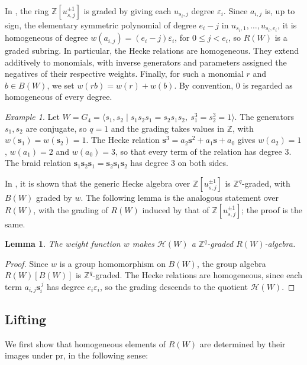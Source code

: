 \documentclass[11pt, reqno]{amsart}
\newcommand{\cH}{\mathcal{H}}
\numberwithin{equation}{section}
\newtheorem{lemma}[theorem]{Lemma}
\theoremstyle{remark}
\newtheorem{example}[theorem]{Example}
\begin{document}
In \cite[\S 1C]{BMM}, the ring $\mathbb Z[u_{s,j}^{\pm1}]$ is graded by giving
each $u_{s_i,j}$ degree $\varepsilon_i$. Since $a_{i,j}$ is, up to sign,
the elementary symmetric polynomial of degree $e_i-j$ in
$u_{s_i,1},\dots,u_{s_i,e_i}$, it is homogeneous of degree
$w(a_{i,j})=(e_i-j)\varepsilon_i$, for $0\le j<e_i$, so $R(W)$ is a
graded subring.
In particular, the Hecke relations are homogeneous. They extend additively to monomials, with inverse generators and parameters assigned the negatives of their respective weights. Finally,
for such a monomial $r$ and $b\in B(W)$, we set $w(rb)=w(r)+w(b)$.  By convention, $0$ is regarded as homogeneous of every degree.

\begin{example}
	Let $W=G_4=\langle s_1,s_2\mid s_1s_2s_1=s_2s_1s_2,\ s_1^3=s_2^3=1\rangle$. The generators $s_1,s_2$ are
	conjugate, so $q=1$ and the grading takes values in $\mathbb Z$, with $w(\mathbf s_1)=w(\mathbf s_2)=1$.
	The Hecke relation $\mathbf s^3=a_2\mathbf s^2+a_1\mathbf s+a_0$ gives $w(a_2)=1$, $w(a_1)=2$ and
	$w(a_0)=3$, so that every term of the relation has degree $3$. The braid relation
	$\mathbf s_1\mathbf s_2\mathbf s_1=\mathbf s_2\mathbf s_1\mathbf s_2$ has degree $3$ on both sides.
\end{example}

In \cite[\S1C]{BMM}, it is shown that the generic Hecke algebra over
$\mathbb Z[u_{s,j}^{\pm1}]$ is $\mathbb Z^q$-graded, with $B(W)$ graded
by $w$. The following lemma is the analogous statement over $R(W)$,
with the grading of $R(W)$ induced by that of
$\mathbb Z[u_{s,j}^{\pm1}]$; the proof is the same.

\begin{lemma}\label{4.13}
	The weight function $w$ makes $\cH(W)$ a $\mathbb{Z}^q$-graded $R(W)$-algebra.
	\end{lemma}
\begin{proof}
Since $w$ is a group homomorphism on $B(W)$, the group algebra
$R(W)[B(W)]$ is $\mathbb Z^q$-graded. The Hecke relations are
homogeneous, since each term $a_{i,j}\mathbf s_i^{\,j}$ has degree
$e_i\varepsilon_i$, so the grading descends to the quotient
$\mathcal H(W)$.
\end{proof}

\subsection{Lifting}\label{sec-3.2}
We first show that homogeneous elements of $R(W)$ are determined by their images under $\mathrm{pr}$, in the following sense:
\end{document}
